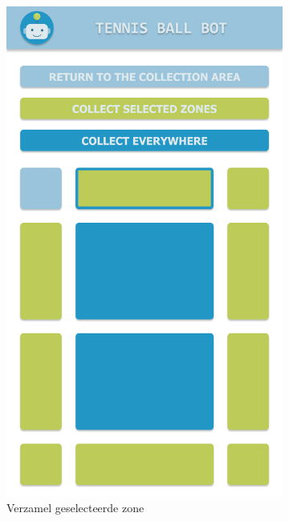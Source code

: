 \begin{figure}[H]
\begin{subfigure}{0.3\textwidth}
        \includegraphics[width=0.9\linewidth]{img/mode-2.png}
        \caption{Verzamel geselecteerde zone}
        \label{fig:mode2}
    \end{subfigure}
        \begin{subfigure}{0.3\textwidth}

\end{subfigure}
\end{figure}
